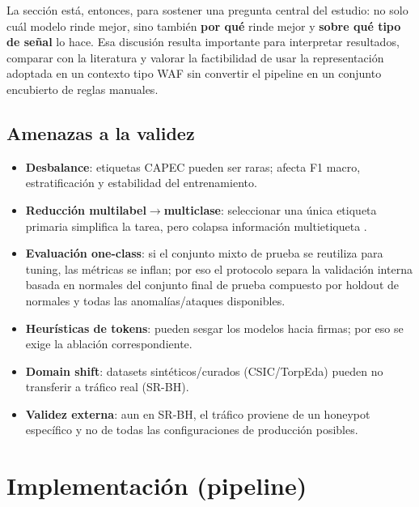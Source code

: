 \documentclass[12pt,oneside]{report}
\begin{document}
La sección está, entonces, para sostener una pregunta central del estudio: no solo cuál modelo rinde mejor, sino también \textbf{por qué} rinde mejor y \textbf{sobre qué tipo de señal} lo hace. Esa discusión resulta importante para interpretar resultados, comparar con la literatura y valorar la factibilidad de usar la representación adoptada en un contexto tipo WAF sin convertir el pipeline en un conjunto encubierto de reglas manuales.

\section{Amenazas a la validez}
\begin{itemize}[leftmargin=*]
  \item \textbf{Desbalance}: etiquetas CAPEC pueden ser raras; afecta F1 macro, estratificación y estabilidad del entrenamiento.
  \item \textbf{Reducción multilabel$\rightarrow$multiclase}: seleccionar una única etiqueta primaria simplifica la tarea, pero colapsa información multietiqueta \cite{capec_schema_docs,capec_schema_desc,owasp_risk_rating}.
  \item \textbf{Evaluación one-class}: si el conjunto mixto de prueba se reutiliza para tuning, las métricas se inflan; por eso el protocolo separa la validación interna basada en normales del conjunto final de prueba compuesto por holdout de normales y todas las anomalías/ataques disponibles.
  \item \textbf{Heurísticas de tokens}: pueden sesgar los modelos hacia firmas; por eso se exige la ablación correspondiente.
  \item \textbf{Domain shift}: datasets sintéticos/curados (CSIC/TorpEda) pueden no transferir a tráfico real (SR-BH).
  \item \textbf{Validez externa}: aun en SR-BH, el tráfico proviene de un honeypot específico y no de todas las configuraciones de producción posibles.
\end{itemize}

\chapter{Implementación (pipeline)}
\end{document}
